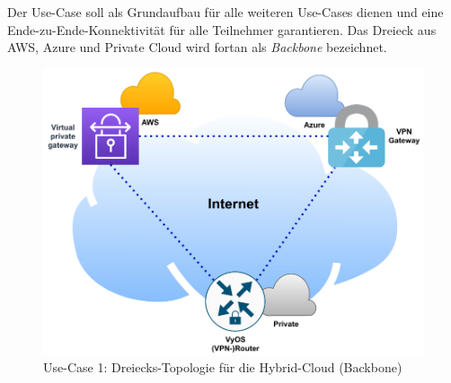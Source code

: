 
Der Use-Case soll als Grundaufbau für alle weiteren Use-Cases dienen und eine Ende-zu-Ende-Konnektivität für alle Teilnehmer garantieren. Das Dreieck aus AWS, Azure und Private Cloud wird fortan als \textit{Backbone} bezeichnet.

\begin{figure}[h]
  \centering
  \includegraphics{Figures/Use-Case-1_Basis_Deployment.pdf}
  \caption{Use-Case 1: Dreiecks-Topologie für die Hybrid-Cloud (\glqq Backbone\grqq{})}
  \label{grafik:Use-Case-1_Basis_Deployment}
\end{figure}\FloatBarrier

